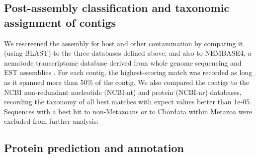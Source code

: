 \documentclass[10pt]{bmc_article}
\newenvironment{bmcformat}{\begin{raggedright}\baselineskip20pt\sloppy\setboolean{publ}{false}}{\end{raggedright}\baselineskip20pt\sloppy}
\begin{document}
\begin{bmcformat}
\subsection*{Post-assembly classification and taxonomic assignment of
  contigs}

We rescreened the assembly for host and other contamination by
comparing it (using BLAST) to the three databases defined above, and
also to NEMBASE4, a nematode transcriptome database derived from whole
genome sequencing and EST assemblies
\cite{parkinson_nembase:resource_2004, pmid21550347}. For each contig,
the highest-scoring match was recorded as long as it spanned more than
50\% of the contig. We also compared the contigs to the NCBI
non-redundant nucleotide (NCBI-nt) and protein (NCBI-nr) databases,
recording the taxonomy of all best matches with expect values better
than 1e-05. Sequences with a best hit to non-Metazoans or to Chordata
within Metazoa were excluded from further analysis.


\subsection*{Protein prediction and annotation}


\end{bmcformat}
\end{document}

